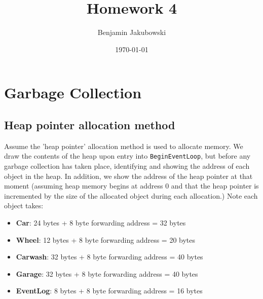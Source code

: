 \documentclass[paper=a4, fontsize=11pt]{scrartcl} %
\title{	Homework 4}
\author{Benjamin Jakubowski} %
\date{\normalsize\today} %
\numberwithin{equation}{section} %
\numberwithin{figure}{section} %
\numberwithin{table}{section} %
\begin{document}
\maketitle %


\section{Garbage Collection}

\subsection{Heap pointer allocation method}

Assume the 'heap pointer' allocation method is used to allocate memory. We draw the contents of the heap upon entry into \texttt{BeginEventLoop}, but before any garbage collection has taken place, identifying and showing the address of each object in the heap. In addition, we show the address of the heap pointer at that moment (assuming heap memory begins at address 0 and that the heap pointer is incremented by the size of the allocated object during each allocation.) Note each object takes:
\begin{itemize}
\item \textbf{Car}: 24 bytes + 8 byte forwarding address = 32 bytes
\item \textbf{Wheel}: 12 bytes + 8 byte forwarding address = 20 bytes
\item \textbf{Carwash}: 32 bytes + 8 byte forwarding address = 40 bytes
\item \textbf{Garage}: 32 bytes + 8 byte forwarding address = 40 bytes
\item \textbf{EventLog}: 8 bytes + 8 byte forwarding address = 16 bytes
\end{itemize}
\end{document}
